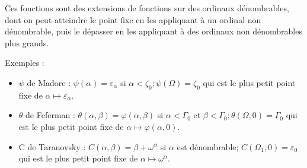 \documentclass[8pt]{article}
\begin{document}
Ces fonctions sont des extensions de fonctions sur des ordinaux dénombrables, dont on peut atteindre le point fixe en les appliquant à un ordinal non dénombrable, puis le dépasser en les appliquant à des ordinaux non dénombrables plus grands.

Exemples :
\vspace{-0.4cm}
\smallskip
\begin{itemize}
     \setlength{\itemsep}{1pt}
     \setlength{\parskip}{0pt}
     \setlength{\parsep}{0pt}
\item \(\psi\) de Madore : \(\psi(\alpha) = \varepsilon_\alpha \) si \(\alpha < \zeta_0 ; \psi(\Omega) = \zeta_0 \) qui est le plus petit point fixe de \( \alpha \mapsto \varepsilon_\alpha \).
\vspace{-0.1cm}
\item \(\theta\) de Feferman : \(\theta(\alpha,\beta) = \varphi(\alpha,\beta) \) si \( \alpha < \Gamma_0 \) et \( \beta < \Gamma_0 ; \theta(\Omega,0) = \Gamma_0 \) qui est le plus petit point fixe de \( \alpha \mapsto \varphi(\alpha,0) \).
\vspace{-0.1cm}
\item C de Taranovsky : \( C(\alpha,\beta) = \beta+\omega^\alpha \) si \( \alpha \) est dénombrable; \( C(\Omega_1,0) = \varepsilon_0 \) qui est le plus petit point fixe de \( \alpha \mapsto \omega^\alpha \).
\end{itemize}

\vspace{0.1cm}
\end{document}
